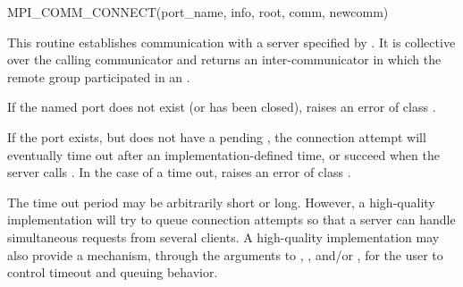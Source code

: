 \begin{funcdef}{MPI\_COMM\_CONNECT}{(\mbox{port\_name}, \mbox{info}, \mbox{root}, \mbox{comm}, \mbox{newcomm})}
\end{funcdef}

This routine establishes communication with a server specified by
. It is collective
over the calling communicator and returns an inter-communicator
in which the remote group participated in an .

If the named port does not exist (or has been closed),
 raises an error of class
.

If the port exists, but does not have a pending
, the connection attempt will eventually
time out after an implementation-defined time, or succeed
when the server calls . In the
case of a time out,  raises
an error of class .

\begin{implementors}
The time out period may be arbitrarily short or long. However, a high-quality
implementation will try to queue connection attempts so that a
server can handle simultaneous requests from several clients.  A high-quality
implementation may also provide a mechanism, through the 
arguments to , , and/or
, for the user to
control timeout and queuing behavior.
\end{implementors}

